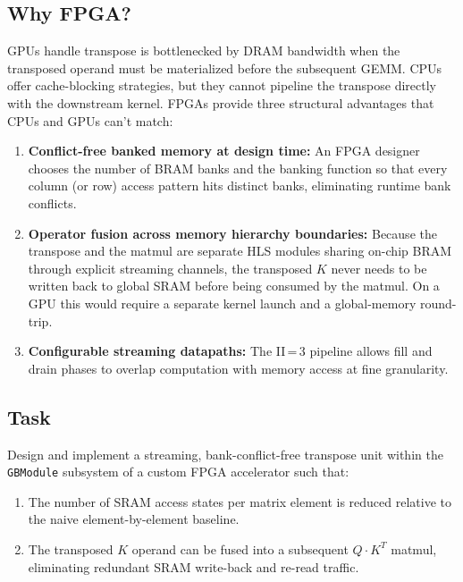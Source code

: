 \documentclass[11pt]{article}
\begin{document}
\subsection{Why FPGA?}
GPUs handle transpose is bottlenecked by DRAM bandwidth when the transposed operand must be materialized before the subsequent GEMM. CPUs offer cache-blocking strategies, but they cannot pipeline the transpose directly
with the downstream kernel.
FPGAs provide three structural advantages that CPUs and GPUs can't match:
\begin{enumerate}[nosep]
  \item \textbf{Conflict-free banked memory at design time:}
        An FPGA designer chooses the number of BRAM banks and the banking
        function so that every column (or row) access pattern hits distinct
        banks, eliminating runtime bank conflicts.
  \item \textbf{Operator fusion across memory hierarchy boundaries:}
        Because the transpose and the matmul are separate HLS modules sharing
        on-chip BRAM through explicit streaming channels, the transposed $K$
        never needs to be written back to global SRAM before being consumed
        by the matmul.  On a GPU this would require a separate kernel launch
        and a global-memory round-trip.
  \item \textbf{Configurable streaming datapaths:}
        The II\,=\,3 pipeline allows fill and drain phases to overlap
        computation with memory access at fine granularity.
\end{enumerate}

\subsection{Task} Design and implement a streaming, bank-conflict-free transpose
unit within the \texttt{GBModule} subsystem of a custom FPGA accelerator such
that:
\begin{enumerate}[nosep]
  \item The number of SRAM access states per matrix element is reduced relative to the naive element-by-element baseline.
  \item The transposed $K$ operand can be fused into a subsequent
        $Q\!\cdot\!K^T$ matmul, eliminating redundant SRAM write-back and
        re-read traffic.
\end{enumerate}
\end{document}
